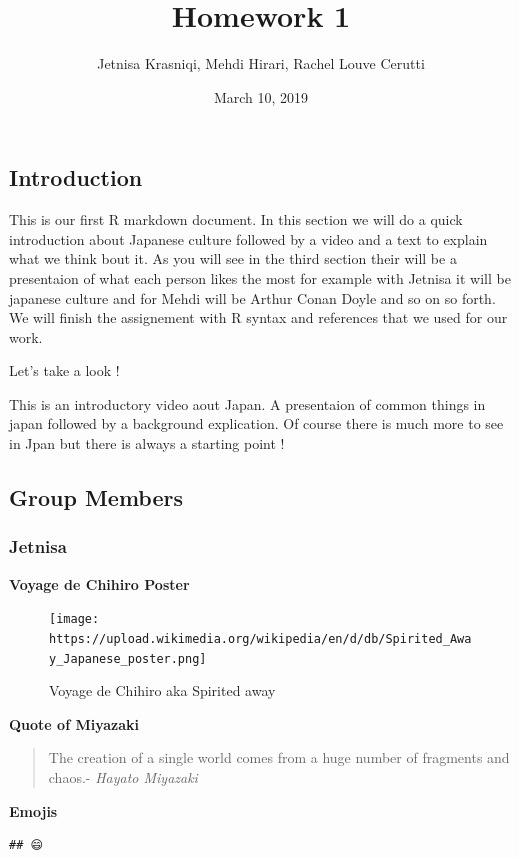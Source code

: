 \documentclass[]{article}
\title{Homework 1}
\author{Jetnisa Krasniqi, Mehdi Hirari, Rachel Louve Cerutti}
\date{March 10, 2019}
\begin{document}
\maketitle

\subsection{Introduction}\label{introduction}

This is our first R markdown document. In this section we will do a
quick introduction about Japanese culture followed by a video and a text
to explain what we think bout it. As you will see in the third section
their will be a presentaion of what each person likes the most for
example with Jetnisa it will be japanese culture and for Mehdi will be
Arthur Conan Doyle and so on so forth. We will finish the assignement
with R syntax and references that we used for our work.

Let's take a look !

This is an introductory video aout Japan. A presentaion of common things
in japan followed by a background explication. Of course there is much
more to see in Jpan but there is always a starting point !

\subsection{Group Members}\label{group-members}

\subsubsection{Jetnisa}\label{jetnisa}

\textbf{Voyage de Chihiro Poster}

\begin{figure}
\centering
\texttt{[image: https://upload.wikimedia.org/wikipedia/en/d/db/Spirited\_Away\_Japanese\_poster.png]}
\caption{Voyage de Chihiro aka Spirited away}
\end{figure}

\textbf{Quote of Miyazaki}

\begin{quote}
The creation of a single world comes from a huge number of fragments and
chaos.- \emph{Hayato Miyazaki}
\end{quote}

\textbf{Emojis}

\begin{verbatim}
## 😄
\end{verbatim}
\end{document}
